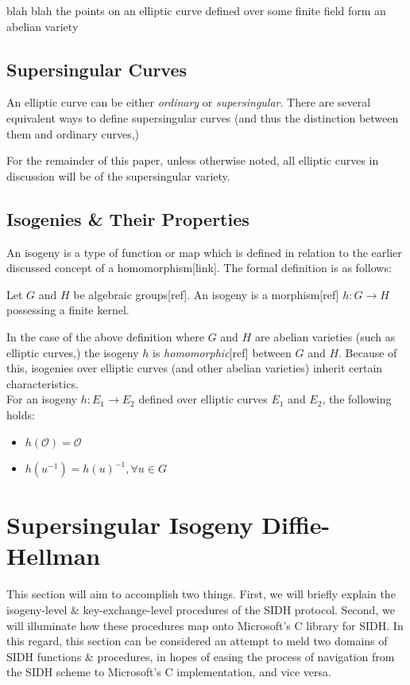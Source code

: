blah blah the points on an elliptic curve defined over some finite field form an abelian variety

\subsection{Supersingular Curves}

An elliptic curve can be either \emph{ordinary} or \emph{supersingular}. There are several equivalent ways to define supersingular curves (and thus the distinction between them and ordinary curves,)

For the remainder of this paper, unless otherwise noted, all elliptic curves in discussion will be of the supersingular variety.

\subsection{Isogenies \& Their Properties}

An isogeny is a type of function or map which is defined in relation to the earlier discussed concept of a homomorphism[link]. The formal definition is as follows:\\
\begin{definition}[Isogeny]
\label{defn:isogeny}
Let $G$ and $H$ be algebraic groups[ref]. An isogeny is a morphism[ref] $h: G \rightarrow H$ possessing a finite kernel.
\end{definition}
In the case of the above definition where $G$ and $H$ are abelian varieties (such as elliptic curves,) the isogeny $h$ is \emph{homomorphic}[ref] between $G$ and $H$. Because of this, isogenies over elliptic curves (and other abelian varieties) inherit certain characteristics.\\
For an isogeny $h: E_{1} \rightarrow E_{2}$ defined over elliptic curves $E_1$ and $E_2$, the following holds:
\begin{itemize}
\item $h(\mathcal{O}) = \mathcal{O}$
\item $h(u^{-1}) = h(u)^{-1}, \forall u \in G$
\end{itemize}

\section{Supersingular Isogeny Diffie-Hellman}

This section will aim to accomplish two things. First, we will briefly explain the isogeny-level \& key-exchange-level procedures of the SIDH protocol. Second, we will illuminate how these procedures map onto Microsoft's C library for SIDH. In this regard, this section can be considered an attempt to meld two domains of SIDH functions \& procedures, in hopes of easing the process of navigation from the SIDH scheme to Microsoft's C implementation, and vice versa.

